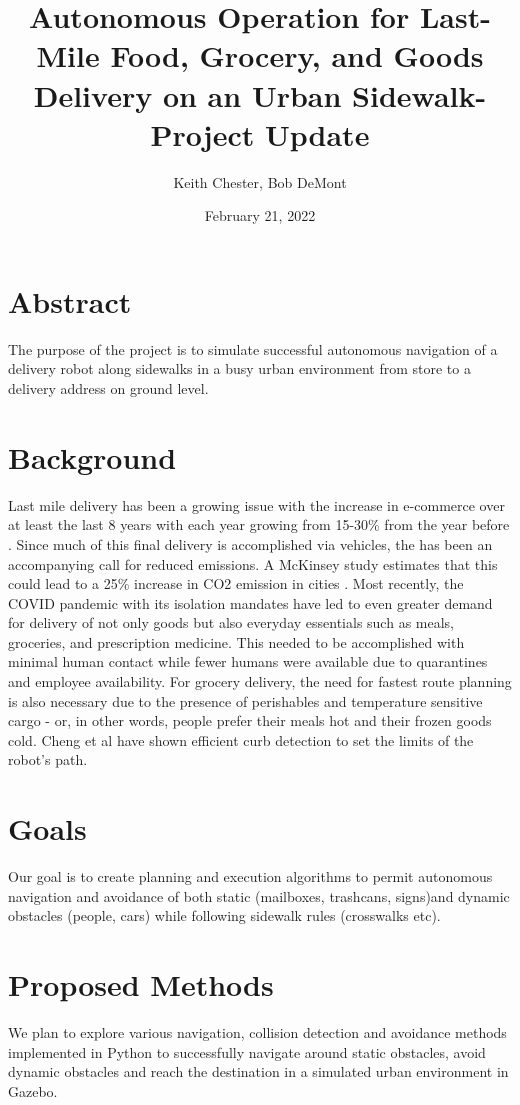 \documentclass{article}
\title{Autonomous Operation for Last-Mile Food, Grocery, and Goods Delivery on an Urban Sidewalk-Project Update }
\author{Keith Chester, Bob DeMont}
\date{February 21, 2022}
\begin{document}
\maketitle


\begin{multicols}{2}
\section*{Abstract}
The purpose of the project is to simulate successful autonomous navigation of a delivery robot along sidewalks in a busy urban environment from store to a delivery address on ground level.

\section*{Background}
Last mile delivery has been a growing issue with the increase in e-commerce over at least the last 8 years with each year growing from 15-30\% from the year before \cite{Ecom}.  Since much of this final delivery is accomplished via vehicles, the has been an accompanying call for reduced emissions.  A McKinsey study estimates that this could lead to a 25\% increase in CO2 emission in cities \cite{Emiss}.  Most recently, the COVID pandemic with its isolation mandates have led to even greater demand for delivery of not only goods but also everyday essentials such as meals, groceries, and prescription medicine.  This needed to be accomplished with minimal human contact while fewer humans were available due to quarantines and employee availability.  For grocery delivery, the need for fastest route planning is also necessary due to the presence of perishables and temperature sensitive cargo - or, in other words, people prefer their meals hot and their frozen goods cold. Cheng et al \cite{Mcheng} have shown efficient curb detection to set the limits of the robot's path.

\section*{Goals}
Our goal is to create planning and execution algorithms to permit autonomous navigation and avoidance of both static (mailboxes, trashcans, signs)and dynamic obstacles (people, cars) while following sidewalk rules (crosswalks etc).

\section*{Proposed Methods}
We plan to explore various navigation, collision detection and avoidance methods implemented in Python to successfully navigate around static obstacles, avoid dynamic obstacles  and reach the destination in a simulated urban environment in Gazebo.


\end{multicols}
\end{document}
